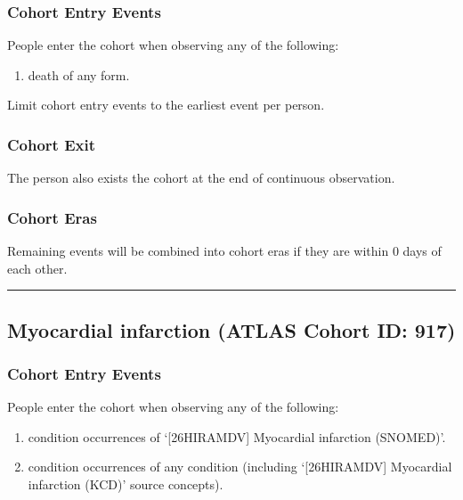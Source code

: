 \documentclass[
  12pt,
]{article}
\providecommand{\tightlist}{%
  \setlength{\itemsep}{0pt}\setlength{\parskip}{0pt}}
\begin{document}
\subsubsection{Cohort Entry Events}\label{cohort-entry-events-16}

People enter the cohort when observing any of the following:

\begin{enumerate}
\def\labelenumi{\arabic{enumi}.}
\tightlist
\item
  death of any form.
\end{enumerate}

Limit cohort entry events to the earliest event per person.

\subsubsection{Cohort Exit}\label{cohort-exit-16}

The person also exists the cohort at the end of continuous observation.

\subsubsection{Cohort Eras}\label{cohort-eras-16}

Remaining events will be combined into cohort eras if they are within 0
days of each other.

\begin{center}\rule{0.5\linewidth}{0.5pt}\end{center}

\subsection{Myocardial infarction (ATLAS Cohort ID:
917)}\label{myocardial-infarction-atlas-cohort-id-917}

\subsubsection{Cohort Entry Events}\label{cohort-entry-events-17}

People enter the cohort when observing any of the following:

\begin{enumerate}
\def\labelenumi{\arabic{enumi}.}
\item
  condition occurrences of `{[}26HIRAMDV{]} Myocardial infarction
  (SNOMED)'.
\item
  condition occurrences of any condition (including `{[}26HIRAMDV{]}
  Myocardial infarction (KCD)' source concepts).
\end{enumerate}
\end{document}
